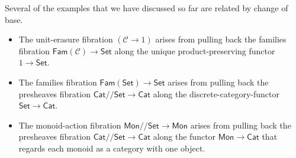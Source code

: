 \documentclass[a4paper,UKenglish]{lipics}
\newcommand\note[1]{{ \bf \textcolor{red} {\vspace{2mm}\; \\ Note: #1\\}}}
\newcommand{\ra}{\rightarrow}
\newcommand{\msf}[1]{\mathsf{#1}} %
\newcommand{\Mon}{\msf{Mon}}
\newcommand{\Set}{\msf{Set}}
\newcommand{\Cat}{\msf{Cat}}
\newcommand{\Fam}[1]{\msf{Fam}(#1)}
\newcommand{\LAb}{\msf{L}_{\msf{Ab}}}
\newcommand{\terminal}{\msf{1}}
\newcommand{\B}{\mathcal{B}}
\newcommand{\C}{\mathcal{C}}
\newcommand{\E}{\mathcal{E}}
\newcommand{\GroupSet}[1]{#1/\!/\Set}
\newcommand{\MonSet}{\GroupSet{\Mon}}
\newcommand{\CatSet}{\GroupSet{\Cat}}
\begin{document}
Several of the examples that we have discussed so far are related by change of base.
\begin{itemize}
\item The unit-erasure fibration $(\C\to 1)$ arises from pulling back the families fibration
$\Fam\C\to\Set$ along the unique product-preserving functor $1\to\Set$.
\item The families fibration $\Fam\Set\to\Set$ arises from pulling back the presheaves fibration
$\CatSet\to\Cat$ along the discrete-category-functor $\Set\to\Cat$.
\item The monoid-action fibration $\MonSet\to\Mon$ arises from pulling
  back the presheaves fibration $\CatSet\to\Cat$ along the functor
  $\Mon\to\Cat$ that regards each monoid as a category with one
  object.
\end{itemize}

%
%
\end{document}
